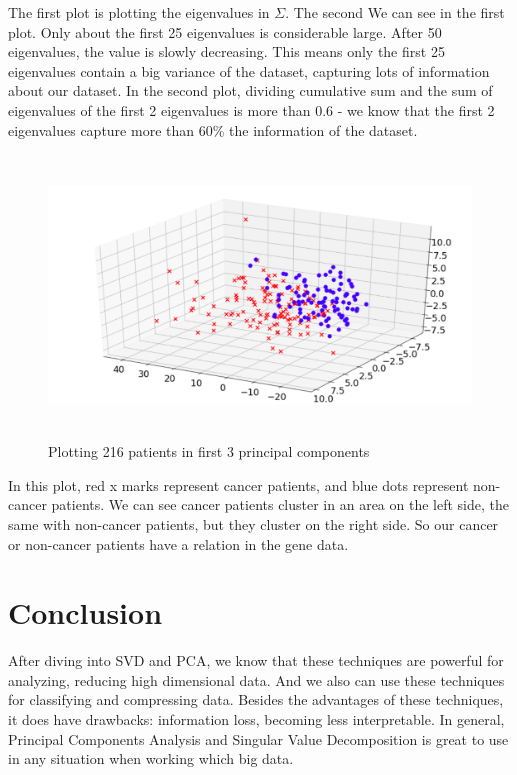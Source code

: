 \documentclass[a4paper, 12pt]{report}
\begin{document}
The first plot is plotting the eigenvalues in $\Sigma$. The second We can see in the first plot. Only about the first 25 eigenvalues is considerable large. After 50 eigenvalues, the value is slowly decreasing. This means only the first 25 eigenvalues contain a big variance of the dataset, capturing lots of information about our dataset. In the second plot, dividing cumulative sum and the sum of eigenvalues of the first 2 eigenvalues is more than 0.6 -  we know that the first 2 eigenvalues capture more than 60\% the information of the dataset.
\begin{figure}[H]
    \center
    \includegraphics[width=15cm,height=7.5cm]{3eigengenes.png}
    \caption{Plotting 216 patients in first 3 principal components}
\end{figure}
\indent \par In this plot, red x marks represent cancer patients, and blue dots represent non-cancer patients. We can see cancer patients cluster in an area on the left side, the same with non-cancer patients, but they cluster on the right side. So our cancer or non-cancer patients have a relation in the gene data.

\chapter{\LARGE Conclusion}
\indent \par After diving into SVD and PCA, we know that these techniques are powerful for analyzing, reducing high dimensional data. And we also can use these techniques for classifying and compressing data. Besides the advantages of these techniques, it does have drawbacks: information loss, becoming less interpretable. In general, Principal Components Analysis and Singular Value Decomposition is great to use in any situation when working which big data.
\end{document}
